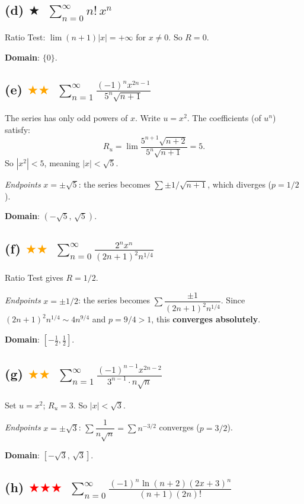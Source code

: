 \documentclass[12pt,a4paper]{article}
\newcommand{\easy}{\textcolor{green!60!black}{$\bigstar$}}
\newcommand{\medium}{\textcolor{orange}{$\bigstar\bigstar$}}
\newcommand{\hard}{\textcolor{red}{$\bigstar\bigstar\bigstar$}}
\begin{document}
\subsection*{(d) \easy\ $\displaystyle\sum_{n=0}^{\infty} n!\, x^n$}

Ratio Test: $\lim(n+1)|x|=+\infty$ for $x\neq 0$.  So $R=0$.

\textbf{Domain}: $\{0\}$.

\subsection*{(e) \medium\ $\displaystyle\sum_{n=1}^{\infty}\frac{(-1)^n x^{2n-1}}{5^n\sqrt{n+1}}$}

The series has only odd powers of $x$.  Write $u = x^2$.  The coefficients (of $u^n$) satisfy:
\[
  R_u = \lim\frac{5^{n+1}\sqrt{n+2}}{5^n\sqrt{n+1}} = 5.
\]
So $|x^2| < 5$, meaning $|x| < \sqrt{5}$.

\textit{Endpoints} $x=\pm\sqrt{5}$: the series becomes $\sum \pm 1/\sqrt{n+1}$, which diverges ($p=1/2$).

\textbf{Domain}: $(-\sqrt{5},\,\sqrt{5})$.

\subsection*{(f) \medium\ $\displaystyle\sum_{n=0}^{\infty}\frac{2^n x^n}{(2n+1)^2 n^{1/4}}$}

Ratio Test gives $R=1/2$.

\textit{Endpoints} $x=\pm 1/2$: the series becomes $\sum\dfrac{\pm 1}{(2n+1)^2 n^{1/4}}$. Since $(2n+1)^2 n^{1/4}\sim 4n^{9/4}$ and $p=9/4>1$, this \textbf{converges absolutely}.

\textbf{Domain}: $[-\tfrac{1}{2}, \tfrac{1}{2}]$.

\subsection*{(g) \medium\ $\displaystyle\sum_{n=1}^{\infty}\frac{(-1)^{n-1} x^{2n-2}}{3^{n-1}\cdot n\sqrt{n}}$}

Set $u=x^2$; $R_u = 3$.  So $|x|<\sqrt{3}$.

\textit{Endpoints} $x=\pm\sqrt{3}$: $\sum\dfrac{1}{n\sqrt{n}}=\sum n^{-3/2}$ converges ($p=3/2$).

\textbf{Domain}: $[-\sqrt{3},\,\sqrt{3}]$.

\subsection*{(h) \hard\ $\displaystyle\sum_{n=0}^{\infty}\frac{(-1)^n \ln(n+2)(2x+3)^n}{(n+1)(2n)!}$}
\end{document}
